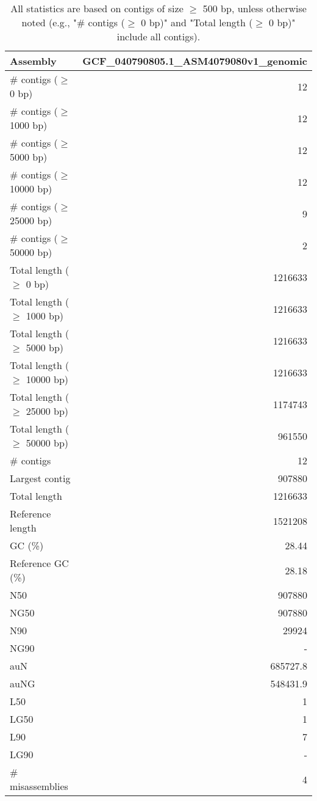 \documentclass[12pt,a4paper]{article}
\begin{document}
\begin{table}[ht]
\begin{center}
\caption{All statistics are based on contigs of size $\geq$ 500 bp, unless otherwise noted (e.g., "\# contigs ($\geq$ 0 bp)" and "Total length ($\geq$ 0 bp)" include all contigs).}
\begin{tabular}{|l*{1}{|r}|}
\hline
Assembly & GCF\_040790805.1\_ASM4079080v1\_genomic \\ \hline
\# contigs ($\geq$ 0 bp) & 12 \\ \hline
\# contigs ($\geq$ 1000 bp) & 12 \\ \hline
\# contigs ($\geq$ 5000 bp) & 12 \\ \hline
\# contigs ($\geq$ 10000 bp) & 12 \\ \hline
\# contigs ($\geq$ 25000 bp) & 9 \\ \hline
\# contigs ($\geq$ 50000 bp) & 2 \\ \hline
Total length ($\geq$ 0 bp) & 1216633 \\ \hline
Total length ($\geq$ 1000 bp) & 1216633 \\ \hline
Total length ($\geq$ 5000 bp) & 1216633 \\ \hline
Total length ($\geq$ 10000 bp) & 1216633 \\ \hline
Total length ($\geq$ 25000 bp) & 1174743 \\ \hline
Total length ($\geq$ 50000 bp) & 961550 \\ \hline
\# contigs & 12 \\ \hline
Largest contig & 907880 \\ \hline
Total length & 1216633 \\ \hline
Reference length & 1521208 \\ \hline
GC (\%) & 28.44 \\ \hline
Reference GC (\%) & 28.18 \\ \hline
N50 & 907880 \\ \hline
NG50 & 907880 \\ \hline
N90 & 29924 \\ \hline
NG90 & - \\ \hline
auN & 685727.8 \\ \hline
auNG & 548431.9 \\ \hline
L50 & 1 \\ \hline
LG50 & 1 \\ \hline
L90 & 7 \\ \hline
LG90 & - \\ \hline
\# misassemblies & 4 \\ \hline

\end{tabular}
\end{center}
\end{table}
\end{document}
